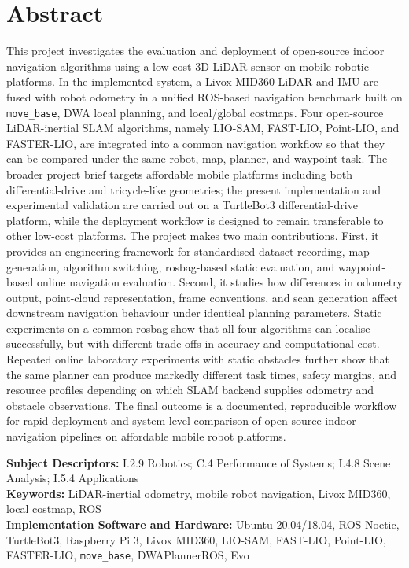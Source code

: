 \documentclass[12pt,a4paper]{report}
\begin{document}
\chapter*{Abstract}
This project investigates the evaluation and deployment of open-source indoor navigation algorithms using a low-cost 3D LiDAR sensor on mobile robotic platforms. In the implemented system, a Livox MID360 LiDAR and IMU are fused with robot odometry in a unified ROS-based navigation benchmark built on \texttt{move\_base}, DWA local planning, and local/global costmaps. Four open-source LiDAR-inertial SLAM algorithms, namely LIO-SAM, FAST-LIO, Point-LIO, and FASTER-LIO, are integrated into a common navigation workflow so that they can be compared under the same robot, map, planner, and waypoint task. The broader project brief targets affordable mobile platforms including both differential-drive and tricycle-like geometries; the present implementation and experimental validation are carried out on a TurtleBot3 differential-drive platform, while the deployment workflow is designed to remain transferable to other low-cost platforms. The project makes two main contributions. First, it provides an engineering framework for standardised dataset recording, map generation, algorithm switching, rosbag-based static evaluation, and waypoint-based online navigation evaluation. Second, it studies how differences in odometry output, point-cloud representation, frame conventions, and scan generation affect downstream navigation behaviour under identical planning parameters. Static experiments on a common rosbag show that all four algorithms can localise successfully, but with different trade-offs in accuracy and computational cost. Repeated online laboratory experiments with static obstacles further show that the same planner can produce markedly different task times, safety margins, and resource profiles depending on which SLAM backend supplies odometry and obstacle observations. The final outcome is a documented, reproducible workflow for rapid deployment and system-level comparison of open-source indoor navigation pipelines on affordable mobile robot platforms.

\textbf{Subject Descriptors:} I.2.9 Robotics; C.4 Performance of Systems; I.4.8 Scene Analysis; I.5.4 Applications\\
\textbf{Keywords:} LiDAR-inertial odometry, mobile robot navigation, Livox MID360, local costmap, ROS\\
\textbf{Implementation Software and Hardware:} Ubuntu 20.04/18.04, ROS Noetic, TurtleBot3, Raspberry Pi 3, Livox MID360, LIO-SAM, FAST-LIO, Point-LIO, FASTER-LIO, \texttt{move\_base}, DWAPlannerROS, Evo
\end{document}
